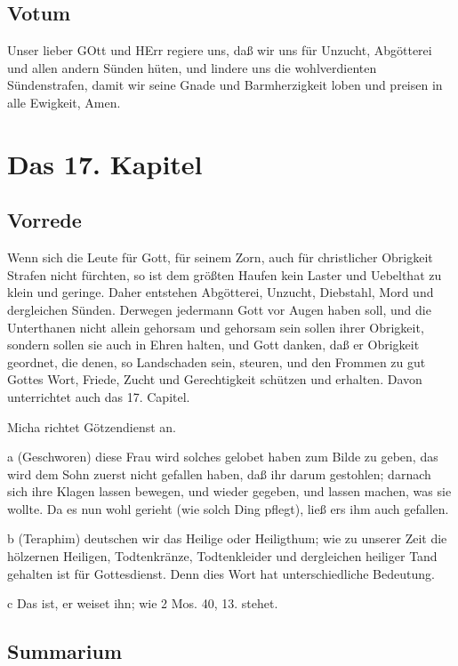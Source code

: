 \section{Votum}

Unser lieber GOtt und HErr regiere uns, daß wir uns für Unzucht, Abgötterei und allen andern Sünden hüten, und lindere uns die wohlverdienten Sündenstrafen, damit wir seine Gnade und Barmherzigkeit loben und preisen in alle Ewigkeit, Amen.

\chapter{Das 17. Kapitel}

\section{Vorrede}

Wenn sich die Leute für Gott, für seinem Zorn, auch für christlicher Obrigkeit Strafen nicht fürchten, so ist dem größten Haufen kein Laster und Uebelthat zu klein und geringe. Daher entstehen Abgötterei, Unzucht, Diebstahl, Mord und dergleichen Sünden. Derwegen jedermann Gott vor Augen haben soll, und die Unterthanen nicht allein gehorsam und gehorsam sein sollen ihrer Obrigkeit, sondern sollen sie auch in Ehren halten, und Gott danken, daß er Obrigkeit geordnet, die denen, so Landschaden sein, steuren, und den Frommen zu gut Gottes Wort, Friede, Zucht und Gerechtigkeit schützen und erhalten. Davon unterrichtet auch das 17. Capitel.

Micha richtet Götzendienst an.

a (Geschworen) diese Frau wird solches gelobet haben zum Bilde zu geben, das wird dem Sohn zuerst nicht gefallen haben, daß ihr darum gestohlen; darnach sich ihre Klagen lassen bewegen, und wieder gegeben, und lassen machen, was sie wollte. Da es nun wohl gerieht (wie solch Ding pflegt), ließ ers ihm auch gefallen.

b (Teraphim) deutschen wir das Heilige oder Heiligthum; wie zu unserer Zeit die hölzernen Heiligen, Todtenkränze, Todtenkleider und dergleichen heiliger Tand gehalten ist für Gottesdienst. Denn dies Wort hat unterschiedliche Bedeutung.

c Das ist, er weiset ihn; wie 2 Mos. 40, 13. stehet.
\section{Summarium}

